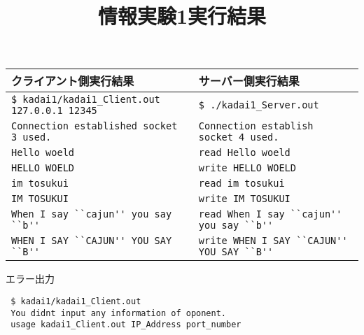 \documentclass[a4paper,12pt]{jarticle}
\title{情報実験1実行結果}
\begin{document}
\maketitle
\begin{center}
 \begin{small}
\begin{tabular}[tb]{|l|l|}\hline
 クライアント側実行結果 &サーバー側実行結果 \\ \hline 
 \verb+$ kadai1/kadai1_Client.out 127.0.0.1 12345+ & \verb+$ ./kadai1_Server.out+ \\
 \verb+Connection established socket 3 used.+ & \verb+Connection establish socket 4 used.+ \\
 \verb+Hello woeld+ & \verb+read Hello woeld+ \\
 \verb+HELLO WOELD+ & \verb+write HELLO WOELD+\\
 \verb+im tosukui+ & \verb+read im tosukui+\\
 \verb+IM TOSUKUI+ & \verb+write IM TOSUKUI+\\
 \verb+When I say ``cajun'' you say ``b'' +& \verb+read When I say ``cajun'' you say ``b''+\\
 \verb+WHEN I SAY ``CAJUN'' YOU SAY ``B'' +& \verb+write WHEN I SAY ``CAJUN'' YOU SAY ``B''+\\ \hline
\end{tabular}
\end{small}
\end{center}
\begin{itembox}{エラー出力}
\begin{verbatim}
 $ kadai1/kadai1_Client.out
 You didnt input any information of oponent.
 usage kadai1_Client.out IP_Address port_number
\end{verbatim} 
\end{itembox}
\end{document}
